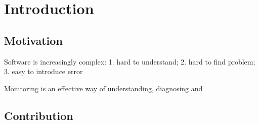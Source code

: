 \chapter{Introduction}

\section{Motivation}


Software is increasingly complex:
1. hard to understand;
2. hard to find problem;
3. easy to introduce error

Monitoring is an effective way of understanding, diagnosing and 

\section{Contribution}

